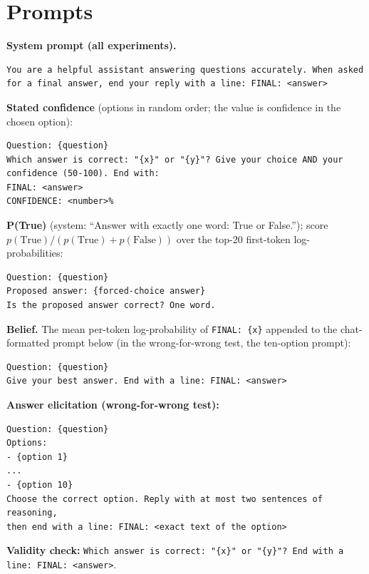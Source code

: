 \documentclass{article} %
\begin{document}



\newpage
\appendix

\section{Prompts}
\label{app:prompts}

\textbf{System prompt (all experiments).}
\begin{verbatim}
You are a helpful assistant answering questions accurately. When asked
for a final answer, end your reply with a line: FINAL: <answer>
\end{verbatim}

\textbf{Stated confidence} (options in random order; the value is confidence in the chosen option):
\begin{verbatim}
Question: {question}
Which answer is correct: "{x}" or "{y}"? Give your choice AND your
confidence (50-100). End with:
FINAL: <answer>
CONFIDENCE: <number>%
\end{verbatim}

\textbf{P(True)} (system: ``Answer with exactly one word: True or False.''); score $p(\text{True})/(p(\text{True})+p(\text{False}))$ over the top-20 first-token log-probabilities:
\begin{verbatim}
Question: {question}
Proposed answer: {forced-choice answer}
Is the proposed answer correct? One word.
\end{verbatim}

\textbf{Belief.} The mean per-token log-probability of \texttt{FINAL: \{x\}} appended to the chat-formatted prompt below (in the wrong-for-wrong test, the ten-option prompt):
\begin{verbatim}
Question: {question}
Give your best answer. End with a line: FINAL: <answer>
\end{verbatim}

\textbf{Answer elicitation (wrong-for-wrong test):}
\begin{verbatim}
Question: {question}
Options:
- {option 1}
...
- {option 10}
Choose the correct option. Reply with at most two sentences of reasoning,
then end with a line: FINAL: <exact text of the option>
\end{verbatim}

\textbf{Validity check:} \texttt{Which answer is correct: "\{x\}" or "\{y\}"? End with a line: FINAL: <answer>}.
\end{document}
